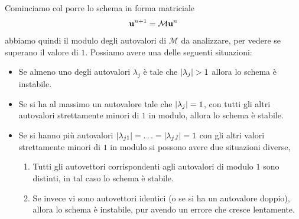 \documentclass[10pt,a4paper]{article}
\begin{document}
Cominciamo col porre lo schema in forma matriciale
\begin{equation}
	\vb{u}^{n+1} = \mathcal{M}\vb{u}^n
\end{equation}
abbiamo quindi il modulo degli autovalori di $\mathcal{M}$ da analizzare, per vedere se superano il valore di $1$. Possiamo avere una delle seguenti situazioni:
\begin{itemize}
	\item Se almeno uno degli autovalori $\lambda_j$ è tale che $\abs{\lambda_j}>1$ allora lo schema è instabile.
	\item Se si ha al massimo un autovalore tale che $\abs{\lambda_j}=1$, con tutti gli altri autovalori strettamente minori di $1$ in modulo, allora lo schema è stabile.
	\item Se si hanno più autovalori $\abs{\lambda_{j1}} = \ldots = \abs{\lambda_{jJ}} = 1$ con gli altri valori strettamente minori di $1$ in modulo si possono avere due situazioni diverse,
	\begin{enumerate}
	 	\item Tutti gli autovettori corrispondenti agli autovalori di modulo $1$ sono distinti, in tal caso lo schema è stabile.
	 	\item Se invece vi sono autovettori identici (o se si ha un autovalore doppio), allora lo schema è instabile, pur avendo un errore che cresce lentamente.
	\end{enumerate} 
\end{itemize}
\end{document}
